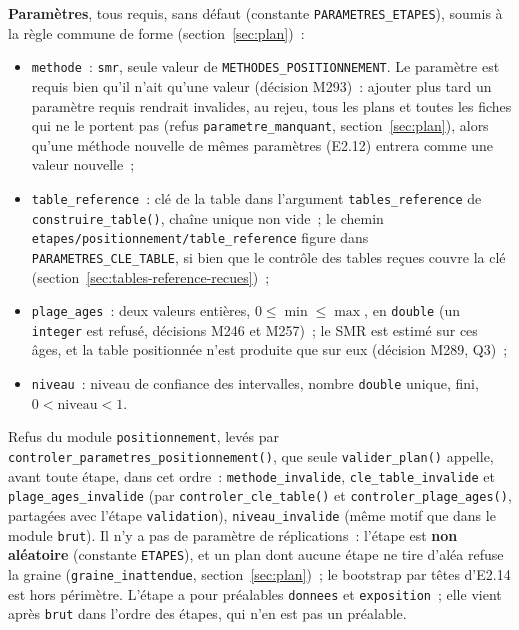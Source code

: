 \documentclass[a4paper,11pt]{article}
\newcommand{\code}[1]{\texttt{\small #1}}
\begin{document}
{\sloppy \textbf{Paramètres}, tous requis, sans défaut (constante
\code{PARAMETRES\_ETAPES}), soumis à la règle commune de forme
(section~\ref{sec:plan})~:
\begin{itemize}[leftmargin=*, itemsep=2pt]
  \item \code{methode}~: \code{smr}, seule valeur de
    \code{METHODES\_POSITIONNEMENT}. Le paramètre est requis bien qu'il
    n'ait qu'une valeur (décision M293)~: ajouter plus tard un paramètre
    requis rendrait invalides, au rejeu, tous les plans et toutes les fiches
    qui ne le portent pas (refus \code{parametre\_manquant},
    section~\ref{sec:plan}), alors qu'une méthode nouvelle de mêmes
    paramètres (E2.12) entrera comme une valeur nouvelle~;
  \item \code{table\_reference}~: clé de la table dans l'argument
    \code{tables\_reference} de \code{construire\_table()}, chaîne unique
    non vide~; le chemin \code{etapes/}\allowbreak\code{positionnement/}\allowbreak\code{table\_reference}
    figure dans \code{PARAMETRES\_CLE\_TABLE}, si bien que le contrôle des
    tables reçues couvre la clé (section~\ref{sec:tables-reference-recues})~;
  \item \code{plage\_ages}~: deux valeurs entières, $0 \le \min \le \max$,
    en \code{double} (un \code{integer} est refusé, décisions M246 et
    M257)~; le SMR est estimé sur ces âges, et la table positionnée n'est
    produite que sur eux (décision M289, Q3)~;
  \item \code{niveau}~: niveau de confiance des intervalles, nombre
    \code{double} unique, fini, $0 < \text{niveau} < 1$.
\end{itemize}\par}
Refus du module \code{positionnement}, levés par
\code{controler\_parametres\_positionnement()}, que seule
\code{valider\_plan()} appelle, avant toute étape, dans cet ordre~:
\code{methode\_invalide}, \code{cle\_table\_invalide} et
\code{plage\_ages\_invalide} (par \code{controler\_cle\_table()} et
\code{controler\_plage\_ages()}, partagées avec l'étape \code{validation}),
\code{niveau\_invalide} (même motif que dans le module \code{brut}). Il n'y
a pas de paramètre de réplications~: l'étape est \textbf{non aléatoire}
(constante \code{ETAPES}), et un plan dont aucune étape ne tire d'aléa
refuse la graine (\code{graine\_inattendue}, section~\ref{sec:plan})~; le
bootstrap par têtes d'E2.14 est hors périmètre. L'étape a pour préalables
\code{donnees} et \code{exposition}~; elle vient après \code{brut} dans
l'ordre des étapes, qui n'en est pas un préalable.
\end{document}
